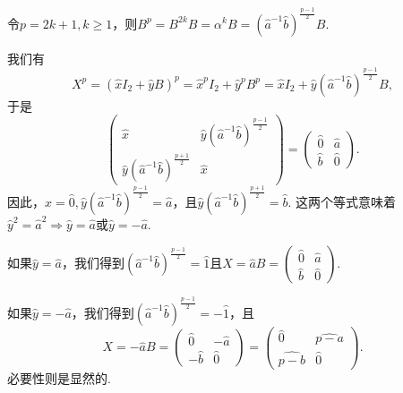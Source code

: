 \begin{solution}
\begin{inparaenum}[(a)]
    令$p=2k+1,k\ge1$，则$B^p=B^{2k}B=\alpha^kB=\left(\hat a^{-1}\hat b\right)^{\frac{p-1}2}B$.

    我们有
    \[
      X^p = ( \hat xI_2 + \hat yB )^p = \hat x^pI_2 + \hat y^pB^p = \hat xI_2 + \hat y
      \left(\hat a^{-1}\hat b\right)^{\frac{p-1}2}B,
    \]
    于是
    \[
      \begin{pmatrix}
        \hat x & \hat y\left(\hat a^{-1}\hat b\right)^{\frac{p-1}2} \\
        \hat y \left(\hat a^{-1}\hat b\right)^{\frac{p+1}2} & \hat x
      \end{pmatrix} =
      \begin{pmatrix}
        \hat 0 & \hat a \\
        \hat b & \hat 0
      \end{pmatrix}.
    \]
    因此，$\hat x= \hat 0,\hat y\left(\hat a^{-1}\hat b\right)^{\frac{p-1}2}=\hat a$，且$\hat y \left(\hat a^{-1}\hat b\right)^{\frac{p+1}2}=\hat b$. 这两个等式意味着$\hat y^2=\hat a^2\Rightarrow \hat y=\hat a$或$\hat y =-\hat a$.

    如果$\hat y =\hat a$，我们得到$\left(\hat a^{-1}\hat b\right)^{\frac{p-1}2}=\hat 1$且$X=\hat aB =\begin{pmatrix}
      \hat 0 & \hat a \\
      \hat b & \hat 0
    \end{pmatrix}$.

    如果$\hat y=-\hat a$，我们得到$\left(\hat a^{-1}\hat b\right)^{\frac{p-1}2}=-\hat 1$，且
    \[
      X = -\hat aB = \begin{pmatrix}
        \hat 0 & -\hat a \\
        -\hat b & \hat 0
      \end{pmatrix} =
      \begin{pmatrix}
        \hat 0 & \widehat {p-a} \\
        \widehat{p-b} & \hat 0
      \end{pmatrix}.
    \]
    必要性则是显然的.
  \end{inparaenum}
\end{solution}

